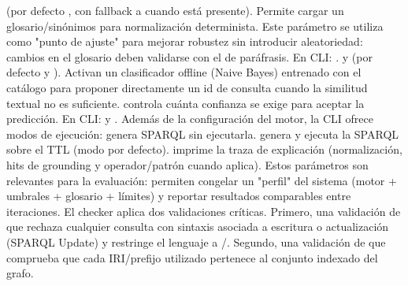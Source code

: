 \markdownRendererUlItem {} (por defecto , con fallback a  cuando está presente). Permite cargar un glosario/sinónimos para normalización determinista. Este parámetro se utiliza como "punto de ajuste" para mejorar robustez sin introducir aleatoriedad: cambios en el glosario deben validarse con el  de paráfrasis. En CLI: .\markdownRendererUlItemEnd 
\markdownRendererUlItem {} y  (por defecto  y ). Activan un clasificador offline (Naive Bayes) entrenado con el catálogo para proponer directamente un id de consulta cuando la similitud textual no es suficiente.  controla cuánta confianza se exige para aceptar la predicción. En CLI:  y .\markdownRendererUlItemEnd 
\markdownRendererUlEnd \markdownRendererInterblockSeparator
{}Además de la configuración del motor, la CLI ofrece modos de ejecución:\markdownRendererInterblockSeparator
{}\markdownRendererUlBeginTight
\markdownRendererUlItem {} genera SPARQL sin ejecutarla.\markdownRendererUlItemEnd 
\markdownRendererUlItem {} genera y ejecuta la SPARQL sobre el TTL (modo por defecto).\markdownRendererUlItemEnd 
\markdownRendererUlItem {} imprime la traza de explicación (normalización, hits de grounding y operador/patrón cuando aplica).\markdownRendererUlItemEnd 
\markdownRendererUlEndTight \markdownRendererInterblockSeparator
{}Estos parámetros son relevantes para la evaluación: permiten congelar un "perfil" del sistema (motor + umbrales + glosario + límites) y reportar resultados comparables entre iteraciones.\markdownRendererInterblockSeparator
{}\markdownRendererInterblockSeparator
{}El checker aplica dos validaciones críticas. Primero, una validación de  que rechaza cualquier consulta con sintaxis asociada a escritura o actualización (SPARQL Update) y restringe el lenguaje a /. Segundo, una validación de  que comprueba que cada IRI/prefijo utilizado pertenece al conjunto indexado del grafo.\markdownRendererInterblockSeparator
